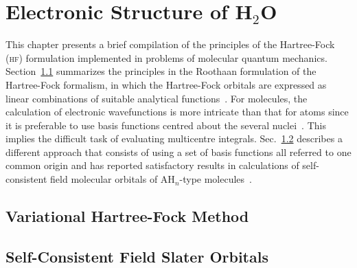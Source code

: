 
\chapter{Electronic Structure of H$_{2}$O}
\label{cha:scf_h2o}




This chapter presents a brief compilation of the principles of the
Hartree-Fock (\textsc{hf}) formulation implemented in problems of
molecular quantum mechanics. Section~\ref{ch:var_hf} summarizes the
principles in the Roothaan formulation of the Hartree-Fock formalism,
in which the Hartree-Fock orbitals are expressed as linear
combinations of suitable analytical functions~\cite{Roothaan_HF}. For
molecules, the calculation of electronic wavefunctions is more
intricate than that for atoms since it is preferable to use basis
functions centred about the several
nuclei~\cite{Pitzer_1968,Pitzer_1970}. This implies the difficult task
of evaluating multicentre integrals. Sec.~\ref{ch:scf_sto} describes a
different approach that consists of using a set of basis functions all
referred to one common origin and has reported satisfactory results in
calculations of self-consistent field molecular orbitals of
AH$_{n}$-type molecules~\cite{Moccia_JCP_2164, Moccia_1964}.




\section{Variational Hartree-Fock Method}
\label{ch:var_hf}

\section{Self-Consistent Field Slater Orbitals}
\label{ch:scf_sto}




